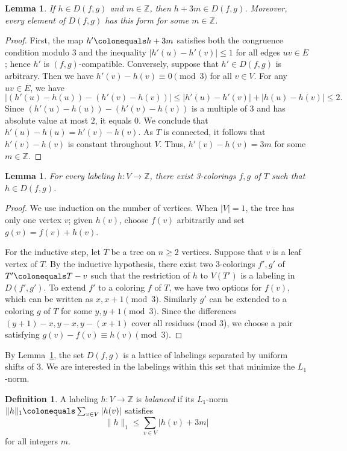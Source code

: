 \documentclass[12pt,reqno]{amsart}
\newtheorem{lem}[thm]{Lemma}
\theoremstyle{definition}
\newtheorem{defn}[thm]{Definition}
\begin{document}
\begin{lem}\label{lem:shift-3m}
If $h\in D(f,g)$ and $m\in\mathbb{Z}$, then $h+3m\in D(f,g)$. Moreover, every element of $D(f,g)$ has this form for some $m\in\mathbb{Z}$.
\end{lem}

\begin{proof}
First, the map $h'\colonequals h+3m$ satisfies both the congruence condition modulo $3$ and the inequality $|h'(u)-h'(v)|\leq 1$ for all edges $uv\in E$; hence $h'$ is $(f,g)$-compatible. Conversely, suppose that $h'\in D(f,g)$ is arbitrary. Then we have $h'(v)-h(v)\equiv 0\pmod{3}$ for all $v\in V$. For any $uv\in E$, we have
$$|(h'(u)-h(u))-(h'(v)-h(v))|\le |h'(u)-h'(v)|+|h(u)-h(v)|\le 2.$$
Since $(h'(u)-h(u))-(h'(v)-h(v))$ is a multiple of $3$ and has absolute value at most $2$, it equals $0$. We conclude that $h'(u)-h(u)=h'(v)-h(v)$. As $T$ is connected, it follows that $h'(v)-h(v)$ is constant throughout $V$. Thus, $h'(v)-h(v)=3m$ for some $m\in\mathbb{Z}$.
\end{proof}

\begin{lem}\label{lem:homs-representable}
For every labeling $h\colon V\to \mathbb{Z}$, there exist 3-colorings $f,g$ of $T$ such that $h\in D(f,g)$.
\end{lem}

\begin{proof}
We use induction on the number of vertices. When $|V|=1$, the tree has only one vertex $v$; given $h(v)$, choose $f(v)$ arbitrarily and set $g(v)=f(v)+h(v)$.

For the inductive step, let $T$ be a tree on $n\geq 2$ vertices. Suppose that $v$ is a leaf vertex of $T$. By the inductive hypothesis, there exist two 3-colorings $f',g'$ of $T'\colonequals T-v$ such that the restriction of $h$ to $V(T')$ is a labeling in $D(f',g')$. To extend $f'$ to a coloring $f$ of $T$, we have two options for $f(v)$, which can be written as $x,x+1 \pmod{3}$. Similarly $g'$ can be extended to a coloring $g$ of $T$ for some $y,y+1 \pmod{3}$. Since the differences $(y+1)-x, y-x, y-(x+1)$ cover all residues (mod $3$), we choose a pair satisfying $g(v)-f(v)\equiv h(v)\pmod{3}$.
\end{proof}

By Lemma~\ref{lem:shift-3m}, the set $D(f,g)$ is a lattice of labelings separated by uniform shifts of $3$. We are interested in the labelings within this set that minimize the $L_1$-norm.

\begin{defn}
A labeling $h\colon V\to \mathbb{Z}$ is \emph{balanced} if its $L_1$-norm $\|h\|_1 \colonequals \sum_{v\in V}|h(v)|$ satisfies
\[
\|h\|_1\leq \sum_{v\in V}|h(v)+3m|
\]
for all integers $m$.
\end{defn} 
\end{document}
